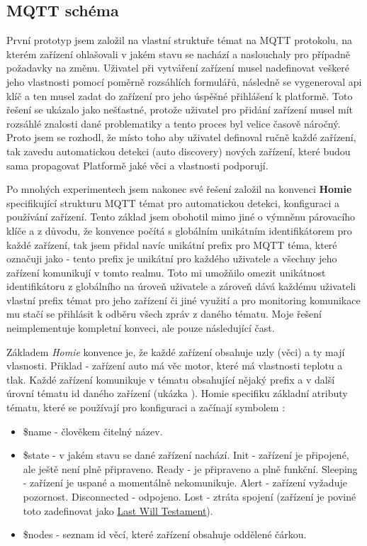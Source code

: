 \subsection{MQTT schéma}
První prototyp jsem založil na vlastní struktuře témat na MQTT protokolu, na kterém zařízení ohlašovali v jakém stavu se nachází a naslouchaly pro případně požadavky na změnu. Uživatel při vytváření zařízení musel nadefinovat veškeré jeho vlastnosti pomocí poměrně rozsáhlích formulářů, následně se vygeneroval api klíč a ten musel zadat do zařízení pro jeho úspěšné přihlášení k platformě. Toto řešení se ukázalo jako nešťastné, protože uživatel pro přidání zařízení musel mít rozsáhlé znalosti dané problematiky a tento proces byl velice časově náročný. Proto jsem se rozhodl, že místo toho aby uživatel definoval ručně každé zařízení, tak zavedu automatickou detekci (auto discovery) nových zařízení, které budou sama propagovat Platformě jaké věci a vlastnosti podporují.

Po mnohých experimentech jsem nakonec své řešení založil na konvenci \textbf{Homie} specifikující strukturu MQTT témat pro automatickou detekci, konfiguraci a používání zařízení. Tento základ jsem obohotil mimo jiné o výmněnu párovacího klíče a z důvodu, že konvence počítá s globálním unikátním identifikátorem pro každé zařízení, tak jsem přidal navíc unikátní prefix pro MQTT téma, které označuji jako  - tento prefix je unikátní pro každého uživatele a všechny jeho zařízení komunikují v tomto realmu. Toto mi umožňilo omezit unikátnost identifikátoru z globálního na úroveň uživatele a zároveň dává každému uživateli vlastní prefix témat pro jeho zařízení či jiné využití a pro monitoring komunikace mu stačí se přihlásit k odběru všech zpráv z daného tématu. Moje řešení neimplementuje kompletní konveci, ale pouze následující čast.

Základem \textit{Homie} konvence je, že každé zařízení obsahuje uzly (věci) a ty mají vlasnosti. Přiklad - zařízení auto má věc motor, které má vlastnosti teplotu a tlak. Každé zařízení komunikuje v tématu obsahující nějaký prefix a v další úrovní tématu id daného zařízení (ukázka ). Homie specifiku základní atributy tématu, které se používají pro konfiguraci a začínají symbolem \uv{\$}:
\begin{itemize}
    \item \$name - člověkem čitelný název.
    \item \$state - v jakém stavu se dané zařízení nachází. Init - zařízení je připojené, ale ještě není plně připraveno. Ready - je připraveno a plně funkční. Sleeping - zařízení je uspané a momentálně nekomunikuje. Alert - zařízení vyžaduje pozornost. Disconnected - odpojeno. Lost - ztráta spojení (zařízení je poviné toto zadefinovat jako \hyperlink{LWT}{Last Will Testament}).
    \item \$nodes - seznam id věcí, které zařízení obsahuje oddělené čárkou.
\end{itemize}

